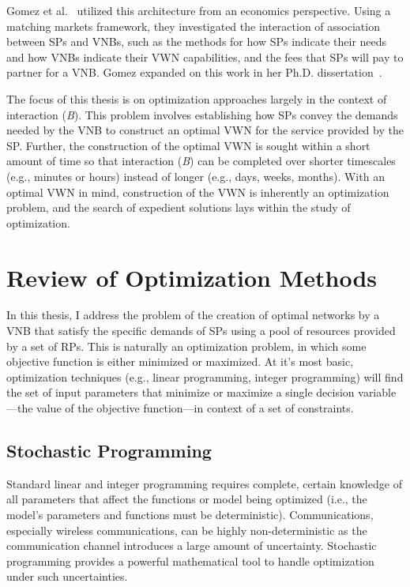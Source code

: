 \documentclass[12pt,dvipsnames]{report}
\begin{document}
Gomez et al.~\cite{pittir33631} utilized this architecture from an economics perspective.  Using a matching markets framework, they investigated the interaction of association between SPs and VNBs, such as the methods for how SPs indicate their needs and how VNBs indicate their VWN capabilities, and the fees that SPs will pay to partner for a VNB.  Gomez expanded on this work in her Ph.D. dissertation~\cite{pittir33130}.

The focus of this thesis is on optimization approaches largely in the context of interaction (\emph{B}).  This problem involves establishing how SPs convey the demands needed by the VNB to construct an optimal VWN for the service provided by the SP.  Further, the construction of the optimal VWN is sought within a short amount of time so that interaction (\emph{B}) can be completed over shorter timescales (e.g., minutes or hours) instead of longer (e.g., days, weeks, months).  With an optimal VWN in mind, construction of the VWN is inherently an optimization problem, and the search of expedient solutions lays within the study of optimization.

\section{Review of Optimization Methods} \label{sec:optreview}

In this thesis, I address the problem of the creation of optimal networks by a VNB that satisfy the specific demands of SPs using a pool of resources provided by a set of RPs.  This is naturally an optimization problem, in which some objective function is either minimized or maximized.  At it's most basic, optimization techniques (e.g., linear programming, integer programming) will find the set of input parameters that minimize or maximize a single decision variable---the value of the objective function---in context of a set of constraints.

\subsection{Stochastic Programming}	\label{subsec:optreview_stoch}

Standard linear and integer programming requires complete, certain knowledge of all parameters that affect the functions or model being optimized (i.e., the model's parameters and functions must be deterministic).  Communications, especially wireless communications, can be highly non-deterministic as the communication channel introduces a large amount of uncertainty.  Stochastic programming provides a powerful mathematical tool to handle optimization under such uncertainties.
\end{document}
